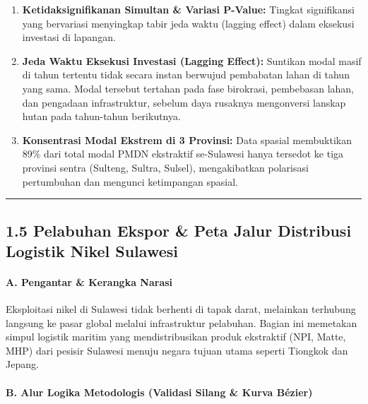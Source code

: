 \documentclass[
]{article}
\providecommand{\tightlist}{%
  \setlength{\itemsep}{0pt}\setlength{\parskip}{0pt}}
\begin{document}
\begin{enumerate}
\def\labelenumi{\arabic{enumi}.}
\tightlist
\item
  \textbf{Ketidaksignifikanan Simultan \& Variasi P-Value:} Tingkat
  signifikansi yang bervariasi menyingkap tabir jeda waktu (lagging
  effect) dalam eksekusi investasi di lapangan.
\item
  \textbf{Jeda Waktu Eksekusi Investasi (Lagging Effect):} Suntikan
  modal masif di tahun tertentu tidak secara instan berwujud pembabatan
  lahan di tahun yang sama. Modal tersebut tertahan pada fase birokrasi,
  pembebasan lahan, dan pengadaan infrastruktur, sebelum daya rusaknya
  mengonversi lanskap hutan pada tahun-tahun berikutnya.
\item
  \textbf{Konsentrasi Modal Ekstrem di 3 Provinsi:} Data spasial
  membuktikan 89\% dari total modal PMDN ekstraktif se-Sulawesi hanya
  tersedot ke tiga provinsi sentra (Sulteng, Sultra, Sulsel),
  mengakibatkan polarisasi pertumbuhan dan mengunci ketimpangan spasial.
\end{enumerate}

\begin{center}\rule{0.5\linewidth}{0.5pt}\end{center}

\subsection{1.5 Pelabuhan Ekspor \& Peta Jalur Distribusi Logistik Nikel
Sulawesi}\label{pelabuhan-ekspor-peta-jalur-distribusi-logistik-nikel-sulawesi}

\paragraph{A. Pengantar \& Kerangka
Narasi}\label{a.-pengantar-kerangka-narasi-2}

Eksploitasi nikel di Sulawesi tidak berhenti di tapak darat, melainkan
terhubung langsung ke pasar global melalui infrastruktur pelabuhan.
Bagian ini memetakan simpul logistik maritim yang mendistribusikan
produk ekstraktif (NPI, Matte, MHP) dari pesisir Sulawesi menuju negara
tujuan utama seperti Tiongkok dan Jepang.

\paragraph{B. Alur Logika Metodologis (Validasi Silang \& Kurva
Bézier)}\label{b.-alur-logika-metodologis-validasi-silang-kurva-buxe9zier}
\end{document}
